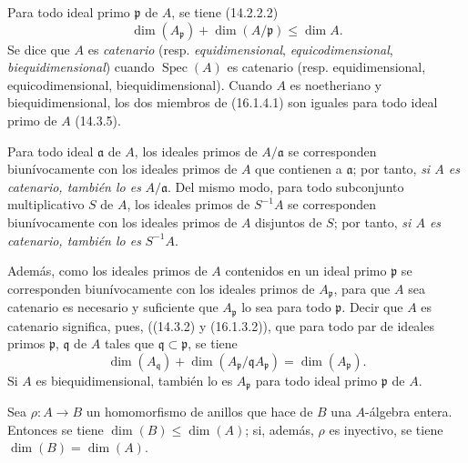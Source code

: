 \begin{env}[16.1.4]
\label{0.16.1.4-fr}
Para todo ideal primo $\mathfrak{p}$ de $A$, se tiene (14.2.2.2)
\[
\label{0.16.1.4.1-fr}
  \dim(A_{\mathfrak{p}})+\dim(A/\mathfrak{p})\leq\dim A.
\tag{16.1.4.1}
\]
Se dice que $A$ es \emph{catenario} (resp. \emph{equidimensional}, \emph{equicodimensional},
\emph{biequidimensional}) cuando $\operatorname{Spec}(A)$ es catenario (resp.
equidimensional,
equicodimensional, biequidimensional). Cuando $A$ es noetheriano y
biequidimensional, los dos miembros de (16.1.4.1) son iguales para todo ideal
primo de $A$ (14.3.5).

Para todo ideal $\mathfrak{a}$ de $A$, los ideales primos de
$A/\mathfrak{a}$ se corresponden biunívocamente con los ideales primos de $A$
que contienen a $\mathfrak{a}$; por tanto, \emph{si $A$ es catenario, también lo es}
$A/\mathfrak{a}$. Del mismo modo, para todo subconjunto multiplicativo $S$ de
$A$, los ideales primos de $S^{-1}A$ se corresponden biunívocamente con los
ideales primos de $A$ disjuntos de $S$; por tanto, \emph{si $A$ es catenario, también
lo es} $S^{-1}A$.

Además, como los ideales primos de $A$ contenidos en un ideal primo
$\mathfrak{p}$ se corresponden biunívocamente con los ideales primos de
$A_{\mathfrak{p}}$, para que $A$ sea catenario es necesario y suficiente que
$A_{\mathfrak{p}}$ lo sea para todo $\mathfrak{p}$. Decir que $A$ es catenario
significa, pues, ((14.3.2) y (16.1.3.2)), que para todo par de ideales primos
$\mathfrak{p}$, $\mathfrak{q}$ de $A$ tales que
$\mathfrak{q}\subset\mathfrak{p}$, se tiene
\[
\label{0.16.1.4.2-fr}
  \dim(A_{\mathfrak{q}})
  +\dim(A_{\mathfrak{p}}/\mathfrak{q}A_{\mathfrak{p}})
  =\dim(A_{\mathfrak{p}}).
\tag{16.1.4.2}
\]
Si $A$ es biequidimensional, también lo es $A_{\mathfrak{p}}$ para todo ideal
primo $\mathfrak{p}$ de $A$.
\end{env}

\begin{proposition}[16.1.5]
\label{0.16.1.5-fr}
Sea $\rho:A\to B$ un homomorfismo de anillos que hace de $B$ una $A$-álgebra
entera. Entonces se tiene $\dim(B)\leq\dim(A)$; si, además, $\rho$ es
inyectivo, se tiene $\dim(B)=\dim(A)$.
\end{proposition}

